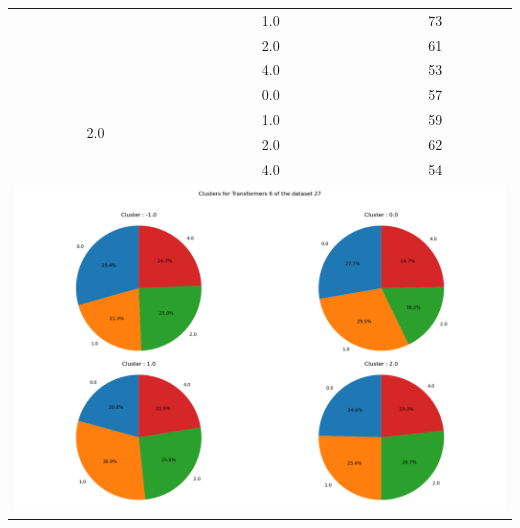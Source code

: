 \begin{longtable}{|c|c|c|c|c|}
& \multicolumn{2}{c|}{1.0} & \multicolumn{2}{c|}{73} \\
& \multicolumn{2}{c|}{2.0} & \multicolumn{2}{c|}{61} \\
& \multicolumn{2}{c|}{4.0} & \multicolumn{2}{c|}{53} \\
\hline
\multirow{4}{*}{2.0} & \multicolumn{2}{c|}{0.0} & \multicolumn{2}{c|}{57} \\
& \multicolumn{2}{c|}{1.0} & \multicolumn{2}{c|}{59} \\
& \multicolumn{2}{c|}{2.0} & \multicolumn{2}{c|}{62} \\
& \multicolumn{2}{c|}{4.0} & \multicolumn{2}{c|}{54} \\
\hline
\multicolumn{5}{|c|}{\includegraphics[width=0.8\linewidth]{img/annexes/27/clustering_pie_charts/Transformers 6.png}} \\
\end{longtable}


